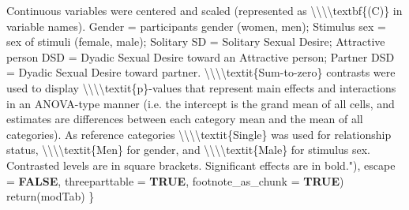 \documentclass[
  bookmarksnumbered]{article}
\newenvironment{Shaded}{\begin{snugshade}}{\end{snugshade}}
\newcommand{\AttributeTok}[1]{\textcolor[rgb]{0.80,0.80,0.80}{#1}}
\newcommand{\ConstantTok}[1]{\textcolor[rgb]{0.86,0.64,0.64}{\textbf{#1}}}
\newcommand{\FunctionTok}[1]{\textcolor[rgb]{0.94,0.94,0.56}{#1}}
\newcommand{\NormalTok}[1]{\textcolor[rgb]{0.80,0.80,0.80}{#1}}
\newcommand{\SpecialCharTok}[1]{\textcolor[rgb]{0.86,0.64,0.64}{#1}}
\newcommand{\StringTok}[1]{\textcolor[rgb]{0.80,0.58,0.58}{#1}}
\begin{document}
\begin{Shaded}
\begin{Highlighting}[]
\StringTok{                              Continuous variables were centered and scaled}
\StringTok{                              (represented as }\SpecialCharTok{\textbackslash{}\textbackslash{}\textbackslash{}\textbackslash{}}\StringTok{textbf\{(C)\} in variable names).}
\StringTok{                              Gender = participants gender (women, men); }
\StringTok{                              Stimulus sex = sex of stimuli (female, male); }
\StringTok{                              Solitary SD = Solitary Sexual Desire;}
\StringTok{                              Attractive person DSD = Dyadic Sexual Desire toward an }
\StringTok{                              Attractive person;}
\StringTok{                              Partner DSD = Dyadic Sexual Desire toward partner.}
\StringTok{                              }\SpecialCharTok{\textbackslash{}\textbackslash{}\textbackslash{}\textbackslash{}}\StringTok{textit\{Sum{-}to{-}zero\} contrasts were used to display}
\StringTok{                              }\SpecialCharTok{\textbackslash{}\textbackslash{}\textbackslash{}\textbackslash{}}\StringTok{textit\{p\}{-}values that represent main effects and interactions }
\StringTok{                              in an ANOVA{-}type manner (i.e. the intercept is the grand mean of }
\StringTok{                              all cells, and estimates are differences between each category}
\StringTok{                              mean and the mean of all categories).}
\StringTok{                              As reference categories }
\StringTok{                              }\SpecialCharTok{\textbackslash{}\textbackslash{}\textbackslash{}\textbackslash{}}\StringTok{textit\{Single\} was used for relationship status,}
\StringTok{                              }\SpecialCharTok{\textbackslash{}\textbackslash{}\textbackslash{}\textbackslash{}}\StringTok{textit\{Men\} for gender,}
\StringTok{                              and }\SpecialCharTok{\textbackslash{}\textbackslash{}\textbackslash{}\textbackslash{}}\StringTok{textit\{Male\} for stimulus sex. }
\StringTok{                              Contrasted levels are in square brackets. }
\StringTok{                              Significant effects are in bold."}\NormalTok{),}
             \AttributeTok{escape =} \ConstantTok{FALSE}\NormalTok{,}
             \AttributeTok{threeparttable =} \ConstantTok{TRUE}\NormalTok{,}
             \AttributeTok{footnote\_as\_chunk =} \ConstantTok{TRUE}\NormalTok{)}
    \FunctionTok{return}\NormalTok{(modTab)}
\NormalTok{\}}
\end{Highlighting}
\end{Shaded}
\end{document}
